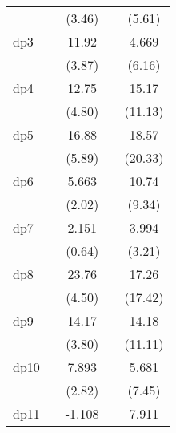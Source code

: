 {\begin{tabular}{l*{4}{c}}
            &                     &      (3.46)         &                     &      (5.61)         \\
[1em]
dp3         &                     &       11.92\sym{***}&                     &       4.669\sym{***}\\
            &                     &      (3.87)         &                     &      (6.16)         \\
[1em]
dp4         &                     &       12.75\sym{***}&                     &       15.17\sym{***}\\
            &                     &      (4.80)         &                     &     (11.13)         \\
[1em]
dp5         &                     &       16.88\sym{***}&                     &       18.57\sym{***}\\
            &                     &      (5.89)         &                     &     (20.33)         \\
[1em]
dp6         &                     &       5.663\sym{*}  &                     &       10.74\sym{***}\\
            &                     &      (2.02)         &                     &      (9.34)         \\
[1em]
dp7         &                     &       2.151         &                     &       3.994\sym{**} \\
            &                     &      (0.64)         &                     &      (3.21)         \\
[1em]
dp8         &                     &       23.76\sym{***}&                     &       17.26\sym{***}\\
            &                     &      (4.50)         &                     &     (17.42)         \\
[1em]
dp9         &                     &       14.17\sym{***}&                     &       14.18\sym{***}\\
            &                     &      (3.80)         &                     &     (11.11)         \\
[1em]
dp10        &                     &       7.893\sym{**} &                     &       5.681\sym{***}\\
            &                     &      (2.82)         &                     &      (7.45)         \\
[1em]
dp11        &                     &      -1.108         &                     &       7.911\sym{***}\\

\end{tabular}}
